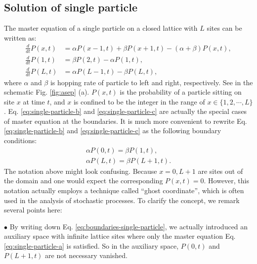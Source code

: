 \subsection{Solution of single particle}
\label{sub:solution_of_single_particle}
The master equation of a single particle on a closed lattice with $L$ sites can be written as:
\begin{subequations}
    \begin{align}
    \label{eq:single-particle-a}
    \frac{d}{dt} P(x,t) & =  \alpha P(x-1,t) + \beta P(x+1,t) - (\alpha + \beta)P(x,t), \\
    \label{eq:single-particle-b}
    \frac{d}{dt} P(1,t) & =  \beta P(2,t) - \alpha P(1,t),\\
    \label{eq:single-particle-c}
    \frac{d}{dt} P(L,t) & =  \alpha P(L-1,t) - \beta P(L,t),
    \end{align}
\end{subequations}
where $\alpha$ and $\beta$ is hopping rate of particle to left and right, respectively. See in the schematic Fig. \ref{fig:asep} (a). $P(x,t)$ is the probability of a particle sitting on site $x$ at time $t$, and $x$ is confined to be the integer in the range of $x\in\{1,2,\cdots,L\}$. Eq.  \eqref{eq:single-particle-b} and \eqref{eq:single-particle-c} are actually the special cases of master equation at the boundaries.  It is much more convenient to rewrite Eq. \eqref{eq:single-particle-b} and \eqref{eq:single-particle-c} as the following boundary conditions:
\begin{subequations}
    \label{eq:boundaries-single-particle}
    \begin{align}
        \label{eq:boundaries-single-particle-a}
        \alpha P(0,t) = \beta P(1,t),\\
        \label{eq:boundaries-single-particle-b}
        \alpha P(L,t) = \beta P(L+1,t).
    \end{align}
\end{subequations}
The notation above might look confusing. Because $x=0,L+1$ are sites out of the domain and one would expect the corresponding $P(x,t)=0$. However, this notation actually employs a technique called ``ghost coordinate'', which is often used in the analysis of stochastic processes. To clarify the concept, we remark several points here:

$\bullet$ By writing down Eq. \eqref{eq:boundaries-single-particle}, we actually introduced an auxiliary space with infinite lattice sites where only the master equation Eq. \eqref{eq:single-particle-a} is satisfied. So in the auxiliary space, $P(0,t)$ and $P(L+1,t)$ are not necessary vanished.

